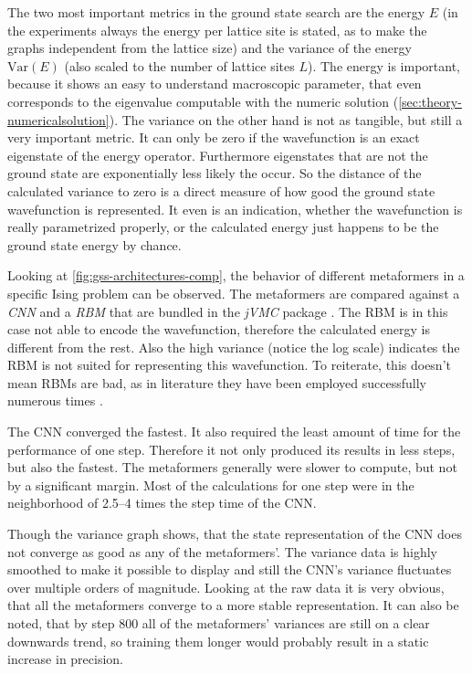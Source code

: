 The two most important metrics in the ground state search are the energy $E$ (in the experiments always the energy per lattice site is stated, as to make the graphs independent from the lattice size) and the variance of the energy $\mathrm{Var}(E)$ (also scaled to the number of lattice sites $L$). 
The energy is important, because it shows an easy to understand macroscopic parameter, that even corresponds to the eigenvalue computable with the numeric solution (\autoref{sec:theory-numericalsolution}).
The variance on the other hand is not as tangible, but still a very important metric.
It can only be zero if the wavefunction is an exact eigenstate of the energy operator. 
Furthermore eigenstates that are not the ground state are exponentially less likely the occur.
So the distance of the calculated variance to zero is a direct measure of how good the ground state wavefunction is represented.
It even is an indication, whether the wavefunction is really parametrized properly, or the calculated energy just happens to be the ground state energy by chance.

Looking at \autoref{fig:gss-architectures-comp}, the behavior of different metaformers in a specific Ising problem can be observed.
The metaformers are compared against a \emph{CNN} and a \emph{RBM} that are bundled in the \emph{jVMC} package \cite{jVMCgithub}.
The RBM is in this case not able to encode the wavefunction, therefore the calculated energy is different from the rest. 
Also the high variance (notice the log scale) indicates the RBM is not suited for representing this wavefunction.
To reiterate, this doesn't mean RBMs are bad, as in literature they have been employed successfully numerous times \cite{restrictedBoltzmanMachines}.

The CNN converged the fastest. It also required the least amount of time for the performance of one step.
Therefore it not only produced its results in less steps, but also the fastest.
The metaformers generally were slower to compute, but not by a significant margin. 
Most of the calculations for one step were in the neighborhood of \SIrange[]{2.5}{4}{} times the step time of the CNN.

Though the variance graph shows, that the state representation of the CNN does not converge as good as any of the metaformers'.
The variance data is highly smoothed to make it possible to display and still the CNN's variance fluctuates over multiple orders of magnitude.
Looking at the raw data it is very obvious, that all the metaformers converge to a more stable representation.
It can also be noted, that by step 800 all of the metaformers' variances are still on a clear downwards trend, so training them longer would probably result in a static increase in precision.

